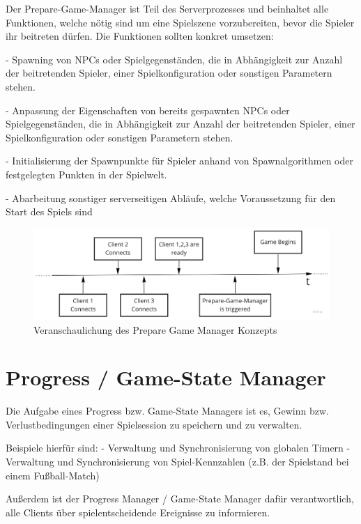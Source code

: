 Der Prepare-Game-Manager ist Teil des Serverprozesses und beinhaltet alle Funktionen, welche nötig sind um eine Spielszene vorzubereiten, bevor die Spieler ihr beitreten dürfen. Die Funktionen sollten konkret umsetzen:

- Spawning \cite{Wikipedia.2020} von NPCs \cite{Wikipedia.2021f} oder Spielgegenständen, die in Abhängigkeit zur Anzahl der beitretenden Spieler, einer Spielkonfiguration oder sonstigen Parametern stehen.

- Anpassung der Eigenschaften von bereits gespawnten NPCs oder Spielgegenständen, die in Abhängigkeit zur Anzahl der beitretenden Spieler, einer Spielkonfiguration oder sonstigen Parametern stehen.

- Initialisierung der Spawnpunkte für Spieler anhand von Spawnalgorithmen oder festgelegten Punkten in der Spielwelt.

- Abarbeitung sonstiger serverseitigen Abläufe, welche Voraussetzung für den Start des Spiels sind

\begin{figure}
	\centering
	\includegraphics[width=150mm]{images/prepare_game_manager.jpg}
	\caption[Prepare-Game-Manager]{Veranschaulichung des Prepare Game Manager Konzepts}
	\label{pic:prepare_game_manager}
\end{figure}

\section{Progress / Game-State Manager}

Die Aufgabe eines Progress bzw. Game-State Managers ist es, Gewinn bzw. Verlustbedingungen einer Spielsession zu speichern und zu verwalten. 

Beispiele hierfür sind:
- Verwaltung und Synchronisierung von globalen Timern
- Verwaltung und Synchronisierung von Spiel-Kennzahlen (z.B. der Spielstand bei einem Fußball-Match)

Außerdem ist der Progress Manager / Game-State Manager dafür verantwortlich, alle Clients über spielentscheidende Ereignisse zu informieren. 


